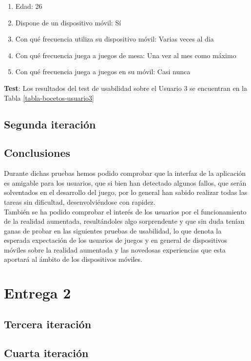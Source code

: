 \begin{itemize}
  \begin{enumerate}
    \item Edad: 26
    \item Dispone de un dispositivo móvil: Sí
    \item Con qué frecuencia utiliza su dispositivo móvil: Varias veces al dia
    \item Con qué frecuencia juega a juegos de mesa: Una vez al mes como máximo
    \item Con qué frecuencia juega a juegos en su móvil: Casi nunca
  \end{enumerate}

  \textbf{Test}: Los resultados del test de usabilidad sobre el Usuario 3 se encuentran en la Tabla \ref{tabla-bocetos-usuario3}

\subsection{Segunda iteración}

\subsection{Conclusiones}
Durante dichas pruebas hemos podido comprobar que la interfaz de la aplicación es amigable para los usuarios, que si bien han detectado algunos fallos, que serán solventados en el desarrollo del juego, por lo general han sabido realizar todas las tareas sin dificultad, desenvolviéndose con rapidez.\\

También se ha podido comprobar el interés de los usuarios por el funcionamiento de la realidad aumentada, resultándoles algo sorprendente y que sin duda tenían ganas de probar en las siguientes pruebas de usabilidad, lo que denota la esperada expectación de los usuarios de juegos y en general de dispositivos móviles sobre la realidad aumentada y las novedosas experiencias que esta aportará al ámbito de los dispositivos móviles.

\section{Entrega 2}

\subsection{Tercera iteración}

\subsection{Cuarta iteración}


\end{itemize}
